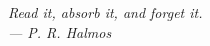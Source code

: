 
\cleardoublepage
\thispagestyle{empty}
\vspace*{0.30\textheight}
\begin{flushright}
\begin{minipage}{0.60\textwidth}
\raggedleft
\itshape
Read it, absorb it, and forget it.\\[0.8em]
\normalfont --- P. R. Halmos
\end{minipage}
\end{flushright}
\cleardoublepage
